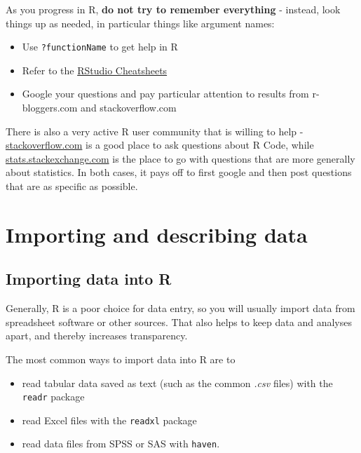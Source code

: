 \documentclass[
]{book}
\providecommand{\tightlist}{%
  \setlength{\itemsep}{0pt}\setlength{\parskip}{0pt}}
\begin{document}
As you progress in R, \textbf{do not try to remember everything} - instead, look things up as needed, in particular things like argument names:

\begin{itemize}
\tightlist
\item
  Use \texttt{?functionName} to get help in R
\item
  Refer to the \href{https://rstudio.com/resources/cheatsheets/}{RStudio Cheatsheets}
\item
  Google your questions and pay particular attention to results from r-bloggers.com and stackoverflow.com
\end{itemize}

There is also a very active R user community that is willing to help - \href{https://stackoverflow.com/}{stackoverflow.com} is a good place to ask questions about R Code, while \href{https://stats.stackexchange.com}{stats.stackexchange.com} is the place to go with questions that are more generally about statistics. In both cases, it pays off to first google and then post questions that are as specific as possible.

\hypertarget{importing-and-describing-data}{%
\chapter{Importing and describing data}\label{importing-and-describing-data}}

\hypertarget{importing-data-into-r}{%
\section{Importing data into R}\label{importing-data-into-r}}

Generally, R is a poor choice for data entry, so you will usually import data from spreadsheet software or other sources. That also helps to keep data and analyses apart, and thereby increases transparency.

The most common ways to import data into R are to

\begin{itemize}
\tightlist
\item
  read tabular data saved as text (such as the common \emph{.csv} files) with the \texttt{readr} package
\item
  read Excel files with the \texttt{readxl} package
\item
  read data files from SPSS or SAS with \texttt{haven}.
\end{itemize}
\end{document}
